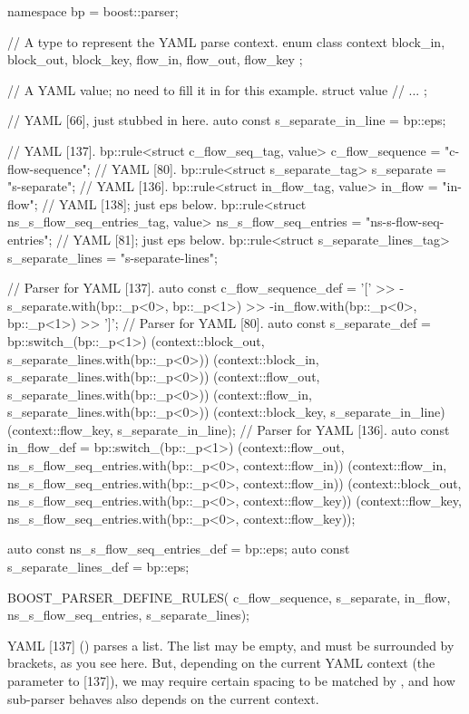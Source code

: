 \documentclass{MyBook}
\begin{document}
\begin{code}
namespace bp = boost::parser;

// A type to represent the YAML parse context.
enum class context {
    block_in,
    block_out,
    block_key,
    flow_in,
    flow_out,
    flow_key
};

// A YAML value; no need to fill it in for this example.
struct value
{
    // ...
};

// YAML [66], just stubbed in here.
auto const s_separate_in_line = bp::eps;

// YAML [137].
bp::rule<struct c_flow_seq_tag, value> c_flow_sequence = "c-flow-sequence";
// YAML [80].
bp::rule<struct s_separate_tag> s_separate = "s-separate";
// YAML [136].
bp::rule<struct in_flow_tag, value> in_flow = "in-flow";
// YAML [138]; just eps below.
bp::rule<struct ns_s_flow_seq_entries_tag, value> ns_s_flow_seq_entries =
    "ns-s-flow-seq-entries";
// YAML [81]; just eps below.
bp::rule<struct s_separate_lines_tag> s_separate_lines = "s-separate-lines";

// Parser for YAML [137].
auto const c_flow_sequence_def =
    '[' >>
    -s_separate.with(bp::_p<0>, bp::_p<1>) >>
    -in_flow.with(bp::_p<0>, bp::_p<1>) >>
    ']';
// Parser for YAML [80].
auto const s_separate_def = bp::switch_(bp::_p<1>)
    (context::block_out, s_separate_lines.with(bp::_p<0>))
    (context::block_in, s_separate_lines.with(bp::_p<0>))
    (context::flow_out, s_separate_lines.with(bp::_p<0>))
    (context::flow_in, s_separate_lines.with(bp::_p<0>))
    (context::block_key, s_separate_in_line)
    (context::flow_key, s_separate_in_line);
// Parser for YAML [136].
auto const in_flow_def = bp::switch_(bp::_p<1>)
    (context::flow_out, ns_s_flow_seq_entries.with(bp::_p<0>, context::flow_in))
    (context::flow_in, ns_s_flow_seq_entries.with(bp::_p<0>, context::flow_in))
    (context::block_out, ns_s_flow_seq_entries.with(bp::_p<0>, context::flow_key))
    (context::flow_key, ns_s_flow_seq_entries.with(bp::_p<0>, context::flow_key));

auto const ns_s_flow_seq_entries_def = bp::eps;
auto const s_separate_lines_def = bp::eps;

BOOST_PARSER_DEFINE_RULES(
    c_flow_sequence,
    s_separate,
    in_flow,
    ns_s_flow_seq_entries,
    s_separate_lines);
\end{code}

YAML {[}137{]} () parses a list. The list may be empty, and must be surrounded by brackets, as you see here. But, depending on the current YAML context (the  parameter to {[}137{]}), we may require certain spacing to be matched by , and how sub-parser  behaves also depends on the current context.
\end{document}
